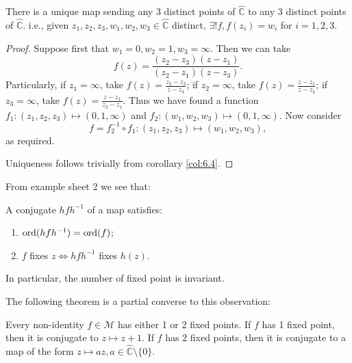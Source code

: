 \documentclass[a4paper]{article}
\begin{document}
      \begin{theorem}\label{thm:6.5}
          There is a unique \mobius map sending any 3 distinct points of $ \hat{\mathbb{C}} $ to any 3 distinct points of $ \hat{\mathbb{C}} $. i.e., given $ z_1,z_2,z_3, w_1,w_2,w_3\in \hat{\mathbb{C}} $ distinct, $ \exists ! f, f(z_i)=w_i $ for $i=1,2,3$.
      \end{theorem}
      \begin{proof}
          Suppose first that $w_1=0,w_2=1,w_3 = \infty $. Then we can take
          \[
              f(z)=\frac{(z_2-z_3)(z-z_1)}{(z_2-z_1)(z-z_3)}.
          \]
          Particularly, if $z_1=\infty$, take $ f(z)=\frac{z_2-z_3}{z-z_3} $; if $z_2=\infty$, take $ f(z)=\frac{z-z_1}{z-z_3} $; if $z_3=\infty$, take $ f(z)=\frac{z-z_1}{z_2-z_1} $. Thus we have found a function $ f_1: (z_1,z_2,z_3) \mapsto (0,1, \infty ) $ and $ f_2:(w_1,w_2,w_3)\mapsto (0,1,\infty ) $. Now consider 
          \[
              f = f_2^{-1}\circ f_1: (z_1,z_2,z_3)\mapsto (w_1,w_2,w_3),
          \]
          as required.

          Uniqueness follows trivially from corollary \ref{col:6.4}.
      \end{proof}
      From example sheet 2 we see that:
      \begin{proposition}\label{prop:egsheet2}
          A conjugate $ hfh^{-1} $ of a \mobius map satisfies:
          \begin{enumerate}
              \item $ \operatorname{ord}(hfh^{-1})=\operatorname{ord}(f) $;
              \item $f$ fixes $z \Leftrightarrow hfh^{-1}$ fixes $h(z)$.
          \end{enumerate}
          In particular, the number of fixed point is invariant.
      \end{proposition}
      The following theorem is a partial converse to this observation:
      \begin{theorem}\label{thm:6.6}
          Every non-identity $f\in \mathcal{M}$ has either 1 or 2 fixed points. If $f$ has 1 fixed point, then it is conjugate to $ z \mapsto z+1 $. If $f$ has 2 fixed points, then it is conjugate to a map of the form $ z \mapsto az, a\in \hat{\mathbb{C}}\setminus \{0\} $.
      \end{theorem}
\end{document}

